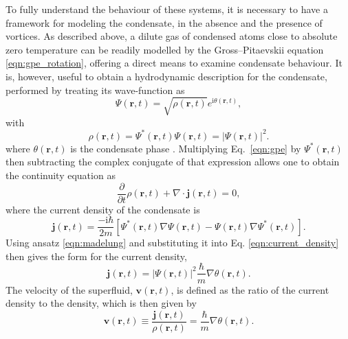 To fully understand the behaviour of these systems, it is necessary to have a framework for modeling the condensate, in the absence and the presence of vortices. As described above, a dilute gas of condensed atoms close to absolute zero temperature can be readily modelled by the Gross--Pitaevskii equation \eqref{eqn:gpe_rotation}, offering a direct means to examine condensate behaviour. It is, however, useful to obtain a hydrodynamic description for the condensate, performed by treating its wave-function as
\begin{equation}\label{eqn:madelung}
\Psi(\textbf{r},t) = \sqrt{\rho(\mathbf{r},t)} e^{\textrm{i}\theta(\textbf{r},t)},
\end{equation}
with
\begin{equation}\label{eqn:density}
\rho(\textbf{r},t) = \Psi^*(\textbf{r},t)\Psi(\textbf{r},t) = \vert \Psi (\textbf{r},t) \vert ^2.
\end{equation}
where $\theta(\textbf{r},t)$ is the condensate phase \cite{BK:Pitaevskii_Stringari_2003}. Multiplying Eq.~\eqref{eqn:gpe} by $\Psi^{*}(\mathbf{r},t)$ then subtracting the complex conjugate of that expression allows one to obtain the continuity equation as~\cite{BK:Pitaevskii_Stringari_2003,BK:Pethick_Smith_2008}
\begin{equation}\label{eqn:continuity}
\frac{\partial}{\partial t}\rho(\textbf{r},t)  + \nabla\cdot \textbf{j}(\textbf{r},t) = 0,
\end{equation}
where the current density of the condensate is
\begin{equation}\label{eqn:current_density}
\textbf{j}(\textbf{r},t) = \frac{-\textrm{i}\hbar}{2m}\left[\Psi^*(\textbf{r},t)\nabla\Psi(\textbf{r},t) - \Psi(\textbf{r},t)\nabla\Psi^*(\textbf{r},t)\right].
\end{equation}
Using ansatz \eqref{eqn:madelung} and substituting it into Eq. \eqref{eqn:current_density} then gives the form for the current density,
\begin{equation}
\textbf{j}(\textbf{r},t) = \vert\Psi(\textbf{r},t)\vert ^2\frac{\hbar}{m}\nabla\theta(\textbf{r},t).
\end{equation}
The velocity of the superfluid, $\textbf{v}(\textbf{r},t)$, is defined as the ratio of the current density to the density, which is then given by
\begin{equation}\label{eqn:velocity}
\textbf{v}(\textbf{r},t)\equiv \frac{\textbf{j}(\textbf{r},t)}{\rho(\textbf{r},t)} = \frac{\hbar}{m}\nabla\theta(\textbf{r},t).
\end{equation}

